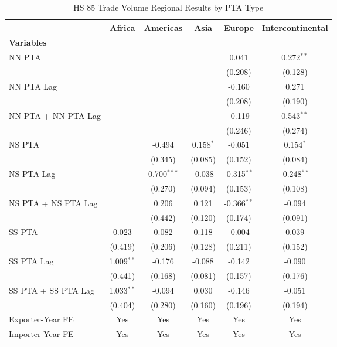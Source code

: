 \begin{table}[htbp]
    \centering
    \caption{HS 85 Trade Volume Regional Results by PTA Type}
    \label{tab:85_trade_pta_types}
    \begin{adjustbox}{max width=\textwidth}
    \begin{tabular}{lccccc}
    \hline
     & \multicolumn{1}{c}{Africa} & \multicolumn{1}{c}{Americas} & \multicolumn{1}{c}{Asia} & \multicolumn{1}{c}{Europe} & \multicolumn{1}{c}{Intercontinental} \\
    \hline
    \textbf{Variables} &  &  &  &  &  \\
    \hline
    NN PTA &  &  &  & 0.041 & 0.272$^{\ast\ast}$ \\
     &  &  &  & (0.208) & (0.128) \\
    NN PTA Lag &  &  &  & -0.160 & 0.271 \\
     &  &  &  & (0.208) & (0.190) \\
    NN PTA + NN PTA Lag &  &  &  & -0.119 & 0.543$^{\ast\ast}$ \\
     &  &  &  & (0.246) & (0.274) \\
    \hline
    NS PTA &  & -0.494 & 0.158$^{\ast}$ & -0.051 & 0.154$^{\ast}$ \\
     &  & (0.345) & (0.085) & (0.152) & (0.084) \\
    NS PTA Lag &  & 0.700$^{\ast\ast\ast}$ & -0.038 & -0.315$^{\ast\ast}$ & -0.248$^{\ast\ast}$ \\
     &  & (0.270) & (0.094) & (0.153) & (0.108) \\
    NS PTA + NS PTA Lag &  & 0.206 & 0.121 & -0.366$^{\ast\ast}$ & -0.094 \\
     &  & (0.442) & (0.120) & (0.174) & (0.091) \\
    \hline
    SS PTA & 0.023 & 0.082 & 0.118 & -0.004 & 0.039 \\
     & (0.419) & (0.206) & (0.128) & (0.211) & (0.152) \\
    SS PTA Lag & 1.009$^{\ast\ast}$ & -0.176 & -0.088 & -0.142 & -0.090 \\
     & (0.441) & (0.168) & (0.081) & (0.157) & (0.176) \\
    SS PTA + SS PTA Lag & 1.033$^{\ast\ast}$ & -0.094 & 0.030 & -0.146 & -0.051 \\
     & (0.404) & (0.280) & (0.160) & (0.196) & (0.194) \\
    \hline
    Exporter-Year FE & Yes & Yes & Yes & Yes & Yes \\
    Importer-Year FE & Yes & Yes & Yes & Yes & Yes \\

\end{tabular}
\end{adjustbox}
\end{table}
